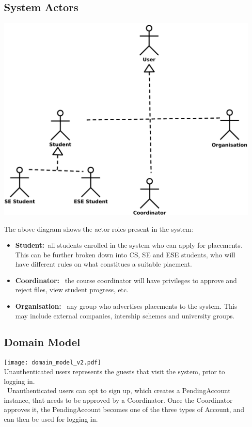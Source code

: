 \documentclass{l3deliverable}
\begin{document}
\subsection{System Actors}
\includegraphics[scale = 0.5]{Actors.pdf}

The above diagram shows the actor roles present in the system:
\begin{itemize}
\item{\textbf{Student:}\ all students enrolled in the system who can apply for placements. This can be further broken down into CS, SE and ESE students, who will have
different rules on what constitues a suitable placment.}
\item{\textbf{Coordinator: }\ the course coordinator will have privileges to approve and reject files, view student progress, etc.}
\item{\textbf{Organisation: }\ any group who advertises placements to the system. This may include external companies, intership schemes and university groups.}
\end{itemize}

\subsection{Domain Model}
\texttt{[image: domain\_model\_v2.pdf]}\\
Unauthenticated users represents the guests that visit the system, prior to logging in.\\\
Unauthenticated users can opt to sign up, which creates a PendingAccount instance, that needs to be approved by a Coordinator. Once the Coordinator approves it, the PendingAccount becomes one of the three types of Account, and can then be used for logging in.\\
\end{document}
